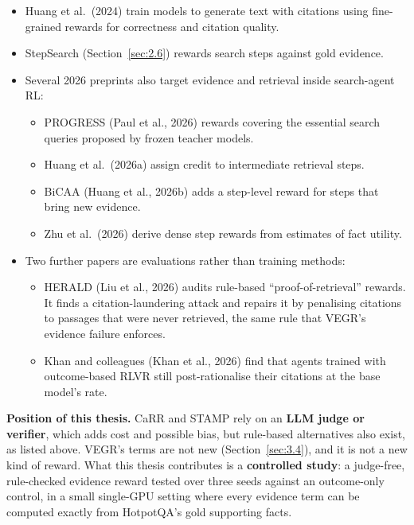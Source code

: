 \begin{itemize}
\tightlist
\item
  Huang et al.~(2024) train models to generate text with citations using
  fine-grained rewards for correctness and citation quality.
\item
  StepSearch (Section~\ref{sec:2.6}) rewards search steps against gold
  evidence.
\item
  Several 2026 preprints also target evidence and retrieval inside
  search-agent RL:

  \begin{itemize}
  \tightlist
  \item
    PROGRESS (Paul et al., 2026) rewards covering the essential search
    queries proposed by frozen teacher models.
  \item
    Huang et al.~(2026a) assign credit to intermediate retrieval steps.
  \item
    BiCAA (Huang et al., 2026b) adds a step-level reward for steps that
    bring new evidence.
  \item
    Zhu et al.~(2026) derive dense step rewards from estimates of fact
    utility.
  \end{itemize}
\item
  Two further papers are evaluations rather than training methods:

  \begin{itemize}
  \tightlist
  \item
    HERALD (Liu et al., 2026) audits rule-based ``proof-of-retrieval''
    rewards. It finds a citation-laundering attack and repairs it by
    penalising citations to passages that were never retrieved, the same
    rule that VEGR's evidence failure enforces.
  \item
    Khan and colleagues (Khan et al., 2026) find that agents trained
    with outcome-based RLVR still post-rationalise their citations at
    the base model's rate.
  \end{itemize}
\end{itemize}

\textbf{Position of this thesis.} CaRR and STAMP rely on an \textbf{LLM
judge or verifier}, which adds cost and possible bias, but rule-based
alternatives also exist, as listed above. VEGR's terms are not new
(Section~\ref{sec:3.4}), and it is not a new kind of reward. What this
thesis contributes is a \textbf{controlled study}: a judge-free,
rule-checked evidence reward tested over three seeds against an
outcome-only control, in a small single-GPU setting where every evidence
term can be computed exactly from HotpotQA's gold supporting facts.

